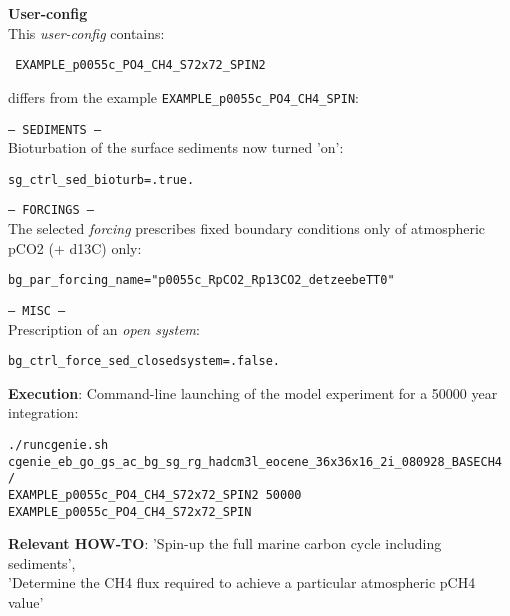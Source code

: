 \documentclass[10pt,twoside]{article}
\begin{document}
\noindent \textbf{User-config} 
\\ This \textit{user-config} contains:
\vspace{-10pt}\begin{verbatim} EXAMPLE_p0055c_PO4_CH4_S72x72_SPIN2 \end{verbatim}\vspace{-10pt}
differs from the example \texttt{EXAMPLE\_p0055c\_PO4\_CH4\_SPIN}:
\begin{compactitem}
		\item \texttt{--- SEDIMENTS ---}
		\\ Bioturbation of the surface sediments now turned 'on':
\vspace{-5pt}\begin{verbatim}
sg_ctrl_sed_bioturb=.true.
		\end{verbatim}\vspace{-5pt}
		\item \texttt{--- FORCINGS ---}
	\\ The selected \textit{forcing} prescribes fixed boundary conditions only of atmospheric pCO2 (+ d13C) only:
	\vspace{-5pt}\begin{verbatim}
bg_par_forcing_name="p0055c_RpCO2_Rp13CO2_detzeebeTT0"
\end{verbatim}\vspace{-5pt}
		\item \texttt{--- MISC ---}
		\\ Prescription of an \textit{open system}:
\vspace{-5pt}\begin{verbatim}
bg_ctrl_force_sed_closedsystem=.false.
		\end{verbatim}\vspace{-5pt}
	\end{compactitem}

\noindent \textbf{Execution}: Command-line launching of the model experiment for a 50000 year integration:
\vspace{-5pt}\begin{verbatim}./runcgenie.sh cgenie_eb_go_gs_ac_bg_sg_rg_hadcm3l_eocene_36x36x16_2i_080928_BASECH4 /
EXAMPLE_p0055c_PO4_CH4_S72x72_SPIN2 50000 EXAMPLE_p0055c_PO4_CH4_S72x72_SPIN\end{verbatim}

\noindent \textbf{Relevant HOW-TO}: 'Spin-up the full marine carbon cycle including sediments',
\\'Determine the CH4 flux required to achieve a particular atmospheric pCH4 value'
\end{document}
